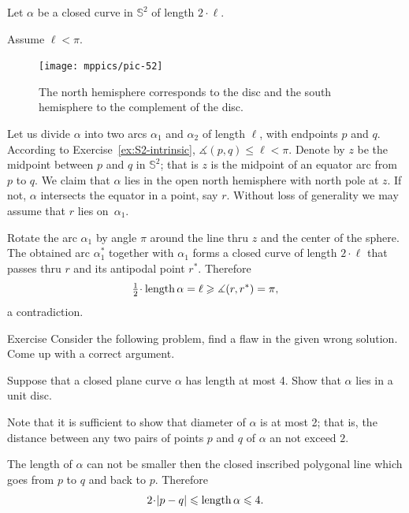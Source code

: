 Let $\alpha$ be a closed curve in $\mathbb{S}^2$ of length $2\cdot\ell$.


Assume $\ell<\pi$.

\begin{figure}
\vskip-0mm
\centering
\texttt{[image: mppics/pic-52]}
\caption*{The north hemisphere corresponds to the disc and the south hemisphere to the complement of the disc.}
\end{figure}

Let us divide $\alpha$ into two arcs $\alpha_1$ and $\alpha_2$ of length $\ell$, with endpoints $p$ and $q$. 
According to Exercise~\ref{ex:S2-intrinsic}, $\measuredangle(p,q)\le\ell<\pi$.
Denote by $z$ be the midpoint between $p$ and $q$ in $\mathbb{S}^2$;
that is $z$ is the midpoint of an equator arc from $p$ to $q$. 
We claim that $\alpha$ lies in the open north hemisphere with north pole at $z$.  
If not, $\alpha$ intersects the equator in a point, say $r$.
Without loss of generality we may assume that $r$ lies on~$\alpha_1$. 

Rotate the arc $\alpha_1$ by angle $\pi$ around the line thru $z$ and the center of the sphere.
The obtained arc $\alpha_1^{*}$ together with $\alpha_1$ forms a closed curve of length $2\cdot \ell$ that passes thru $r$ and its antipodal point $r^{*}$.
Therefore
\[\tfrac12\cdot\length \alpha=\ell\ge \measuredangle(r,r^{*})=\pi,\] 
a contradiction.
\qeds

\begin{thm}{Exercise}\label{ex:flaw}
Consider the following problem, find a flaw in the given wrong solution.
Come up with a correct argument.
\end{thm}

 
Suppose that a closed plane curve $\alpha$ has length at most 4.
Show that $\alpha$ lies in a unit disc.

Note that it is sufficient to show that diameter of $\alpha$ is at most 2;
that is, the distance between any two pairs of points $p$ and $q$ of $\alpha$ an not exceed $2$.

The length of $\alpha$ can not be smaller then the closed inscribed polygonal line which goes from $p$ to $q$ and back to $p$.
Therefore 
\[2\cdot |p-q|\le\length \alpha\le 4.\]
\qedsf
